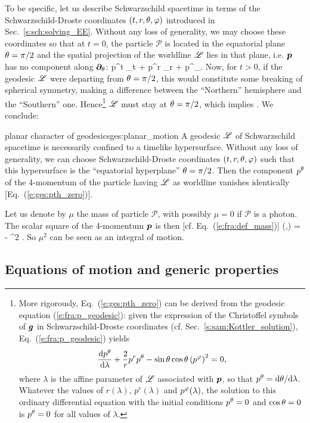 To be specific, let us describe Schwarzschild spacetime in terms of the
Schwarzschild-Droste coordinates $(t,r,\theta,\varphi)$ introduced in Sec.~\ref{s:sch:solving_EE}.
Without any loss of generality, we may choose these coordinates so that
at $t=0$, the particle $\mathscr{P}$ is located in the equatorial plane $\theta=\pi/2$ and
the spatial projection of the worldline $\mathscr{L}$ lies in that plane, i.e. $\bm{p}$ has
no component along $\bm{\partial}_\theta$:
\be
      p^t \wpar_{t} + p^r \wpar_r + p^\ph \wpar_\ph .
\ee
Now, for $t>0$, if the geodesic $\mathscr{L}$ were departing from $\theta=\pi/2$, this
would constitute some breaking of spherical symmetry, making a difference
between the ``Northern'' hemisphere and the ``Southern'' one.
Hence\footnote{More rigorously, Eq.~(\ref{e:ges:pth_zero}) can
be derived from the geodesic equation (\ref{e:fra:p_geodesic}): given
the expression of the Christoffel symbols of $\bm{g}$ in Schwarzschild-Droste
coordinates (cf. Sec.~\ref{s:sam:Kottler_solution}), Eq.~(\ref{e:fra:p_geodesic})
yields \[\frac{\mathrm{d} p^\theta}{\mathrm{d}\lambda} +\frac{2}{r}  p^r p^\theta - \sin\theta\cos\theta \left( p^\varphi \right)^2 = 0,\] where $\lambda$ is the affine parameter of $\mathscr{L}$ associated with $\bm{p}$,
so that $p^\theta=\mathrm{d}\theta/\mathrm{d}\lambda$. Whatever the values of $r(\lambda)$,
$p^r(\lambda)$ and $p^\varphi(\lambda)$,
the solution to this ordinary differential equation with the initial conditions $p^\theta=0$ and
$\cos\theta=0$ is $p^\theta=0$ for all values of $\lambda$.} $\mathscr{L}$
must stay at $\theta=\pi/2$, which implies
\be \label{e:ges:pth_zero}
     .
\ee
We conclude:
\begin{tprop}{planar character of geodesics}{ges:planar_motion}
A geodesic $\mathscr{L}$ of Schwarzschild spacetime is necessarily confined to a timelike hypersurface.
Without any loss of generality, we can choose Schwarzschild-Droste coordinates $(t,r,\theta,\varphi)$
such that this hypersurface is the ``equatorial hyperplane'' $\theta=\pi/2$.
Then the component $p^\theta$ of the 4-momentum of the particle having $\mathscr{L}$ as worldline
vanishes identically [Eq.~(\ref{e:ges:pth_zero})].
\end{tprop}

Let us denote by $\mu$ the mass of particle $\mathscr{P}$, with possibly
$\mu=0$ if $\mathscr{P}$ is a photon. The scalar square of the 4-momentum $\bm{p}$ is
then [cf. Eq.~(\ref{e:fra:def_mass})]
\be \label{e:ges:p2_mu2}
    (,) = - \mu^2 .
\ee
So $\mu^2$ can be seen as an integral of motion.

\subsection{Equations of motion and generic properties} \label{s:ges:eq_to_be_solved}

